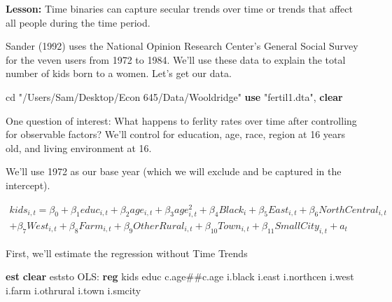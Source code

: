 \documentclass[
]{book}
\newenvironment{Shaded}{\begin{snugshade}}{\end{snugshade}}
\newcommand{\BaseNTok}[1]{\textcolor[rgb]{0.00,0.00,0.81}{#1}}
\newcommand{\KeywordTok}[1]{\textcolor[rgb]{0.13,0.29,0.53}{\textbf{#1}}}
\newcommand{\NormalTok}[1]{#1}
\newcommand{\StringTok}[1]{\textcolor[rgb]{0.31,0.60,0.02}{#1}}
\begin{document}
\textbf{Lesson:} Time binaries can capture secular trends over time or trends that
affect all people during the time period.

Sander (1992) uses the National Opinion Research Center's General Social Survey for the veven users from 1972 to 1984. We'll use these data to explain the total number of kids born to a women. Let's get our data.

\begin{Shaded}
\begin{Highlighting}[]
\NormalTok{cd }\StringTok{"/Users/Sam/Desktop/Econ 645/Data/Wooldridge"}
\KeywordTok{use} \StringTok{"fertil1.dta"}\NormalTok{, }\KeywordTok{clear}
\end{Highlighting}
\end{Shaded}

One question of interest:
What happens to ferlity rates over time after controlling for observable factors?
We'll control for education, age, race, region at 16 years old, and living environment at 16.

We'll use 1972 as our base year (which we will exclude and be captured in the
intercept).

\[ \begin{aligned} kids_{i,t} = \beta_0 + \beta_1 educ_{i,t} + \beta_2 age_{i,t} + \beta_3 age^2_{i,t} + \beta_4 Black_{i} + \beta_5 East_{i,t} + \beta_6 NorthCentral_{i,t} \\ + \beta_7 West_{i,t} + \beta_8 Farm_{i,t} + \beta_9 OtherRural_{i,t} + \beta_{10} Town_{i,t} + \beta_{11} SmallCity_{i,t} + a_{t} \end{aligned} \]

First, we'll estimate the regression without Time Trends

\begin{Shaded}
\begin{Highlighting}[]
\KeywordTok{est} \KeywordTok{clear}
\NormalTok{eststo OLS: }\KeywordTok{reg}\NormalTok{ kids educ c.age\#\#c.age i.}\BaseNTok{black}\NormalTok{ i.east i.northcen i.west i.farm i.othrural i.town i.smcity }
\end{Highlighting}
\end{Shaded}
\end{document}
